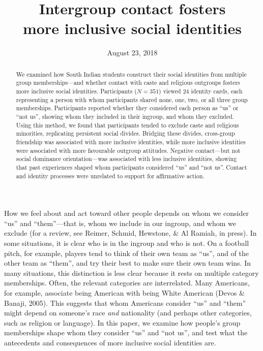 \documentclass[12pt, a4paper]{article}
\title{Intergroup contact fosters\\more inclusive social identities}
\date{August 23, 2018}
\begin{document}
\maketitle

\begin{abstract}
\noindent We examined how South Indian students construct their social identities from multiple group memberships---and whether contact with caste and religious outgroups fosters more inclusive social identities. Participants ($N = 351$) viewed 24 identity cards, each representing a person with whom participants shared none, one, two, or all three group memberships. Participants reported whether they considered each person as ``us'' or ``not us'', showing whom they included in their ingroup, and whom they excluded. Using this method, we found that participants tended to exclude caste and religious minorities, replicating persistent social divides. Bridging these divides, cross-group friendship was associated with more inclusive identities, while more inclusive identities were associated with more favourable outgroup attitudes. Negative contact---but not social dominance orientation---was associated with less inclusive identities, showing that past experiences shaped whom participants considered ``us'' and ``not us''. Contact and identity processes were unrelated to support for affirmative action.\\[1ex]
\end{abstract}

\linenumbers

\noindent How we feel about and act toward other people depends on whom we consider ``us'' and ``them''---that is, whom we include in our ingroup, and whom we exclude (for a review, see Reimer, Schmid, Hewstone, \& Al Ramiah, in press). In some situations, it is clear who is in the ingroup and who is not. On a football pitch, for example, players tend to think of their own team as ``us'', and of the other team as ``them'', and try their best to make sure their own team wins. In many situations, this distinction is less clear because it rests on multiple category memberships. Often, the relevant categories are interrelated. Many Americans, for example, associate being American with being White American (Devos \& Banaji, 2005). This suggests that whom Americans consider ``us'' and ``them'' might depend on someone's race \emph{and} nationality (and perhaps other categories, such as religion or language). In this paper, we examine how people's group memberships shape whom they consider ``us'' and ``not us'', and test what the antecedents and consequences of more inclusive social identities are.
\end{document}
